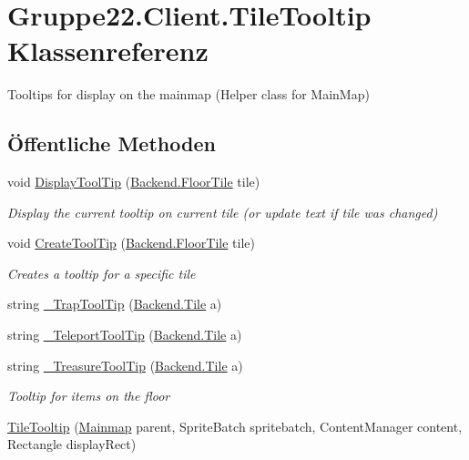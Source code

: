 \hypertarget{class_gruppe22_1_1_client_1_1_tile_tooltip}{\section{Gruppe22.\-Client.\-Tile\-Tooltip Klassenreferenz}
\label{class_gruppe22_1_1_client_1_1_tile_tooltip}
}


Tooltips for display on the mainmap (Helper class for Main\-Map)  


\subsection*{Öffentliche Methoden}
\begin{DoxyCompactItemize}
\item 
void \hyperlink{class_gruppe22_1_1_client_1_1_tile_tooltip_aaf58e2b3314af4fccf0d5d3de3411b13}{Display\-Tool\-Tip} (\hyperlink{class_gruppe22_1_1_backend_1_1_floor_tile}{Backend.\-Floor\-Tile} tile)
\begin{DoxyCompactList}\small\item\em Display the current tooltip on current tile (or update text if tile was changed) \end{DoxyCompactList}\item 
void \hyperlink{class_gruppe22_1_1_client_1_1_tile_tooltip_a18f341d814434559c861af5282621e9f}{Create\-Tool\-Tip} (\hyperlink{class_gruppe22_1_1_backend_1_1_floor_tile}{Backend.\-Floor\-Tile} tile)
\begin{DoxyCompactList}\small\item\em Creates a tooltip for a specific tile \end{DoxyCompactList}\item 
string \hyperlink{class_gruppe22_1_1_client_1_1_tile_tooltip_a844f64788399aac810734cb29819d400}{\-\_\-\-Trap\-Tool\-Tip} (\hyperlink{class_gruppe22_1_1_backend_1_1_tile}{Backend.\-Tile} a)
\item 
string \hyperlink{class_gruppe22_1_1_client_1_1_tile_tooltip_a96068fce14b9abfaf9504622448a42ae}{\-\_\-\-Teleport\-Tool\-Tip} (\hyperlink{class_gruppe22_1_1_backend_1_1_tile}{Backend.\-Tile} a)
\item 
string \hyperlink{class_gruppe22_1_1_client_1_1_tile_tooltip_a222b0a67ae7ec7963bce9b39fee9bf6a}{\-\_\-\-Treasure\-Tool\-Tip} (\hyperlink{class_gruppe22_1_1_backend_1_1_tile}{Backend.\-Tile} a)
\begin{DoxyCompactList}\small\item\em Tooltip for items on the floor \end{DoxyCompactList}\item 
\hyperlink{class_gruppe22_1_1_client_1_1_tile_tooltip_a0ce526c3f55d6aa58400421b89d111e9}{Tile\-Tooltip} (\hyperlink{class_gruppe22_1_1_client_1_1_mainmap}{Mainmap} parent, Sprite\-Batch spritebatch, Content\-Manager content, Rectangle display\-Rect)
\end{DoxyCompactItemize}


